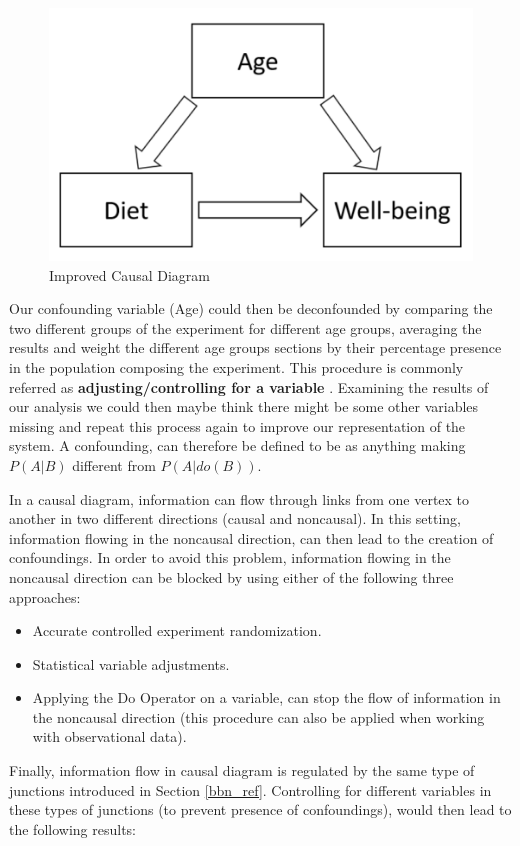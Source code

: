 \begin{figure}[ht!]%
    \centering
    \includegraphics[width=0.4\linewidth]{latex/images/simple_ex2.pdf}
    \vspace{-0.2cm}
    \caption{Improved Causal Diagram}
    \label{cex2}
\end{figure}
\vspace{-0.5cm}

Our confounding variable (Age) could then be deconfounded by comparing the two different groups of the experiment for different age groups, averaging the results and weight the different age groups sections by their percentage presence in the population composing the experiment. This procedure is commonly referred as \textbf{adjusting/controlling for a variable} \cite{why}. Examining the results of our analysis we could then maybe think there might be some other variables missing and repeat this process again to improve our representation of the system. A confounding, can therefore be defined to be as anything making $P(A|B)$ different from $P(A|do(B))$.   

In a causal diagram, information can flow through links from one vertex to another in two different directions (causal and noncausal). In this setting, information flowing in the noncausal direction, can then lead to the creation of confoundings. In order to avoid this problem, information flowing in the noncausal direction can be blocked by using either of the following three approaches:

\begin{itemize}
    \item Accurate controlled experiment randomization.
    \item Statistical variable adjustments.
    \item Applying the Do Operator on a variable, can stop the flow of information in the noncausal direction (this procedure can also be applied when working with observational data).
\end{itemize}

Finally, information flow in causal diagram is regulated by the same type of junctions introduced in Section \ref{bbn_ref}. Controlling for different variables in these types of junctions (to prevent presence of confoundings), would then lead to the following results:

